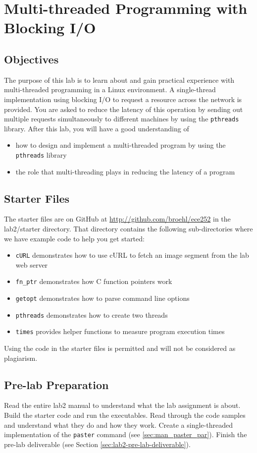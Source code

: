 \chapter{Multi-threaded Programming with Blocking I/O}
\label{ch2_pthreads}

\section{Objectives}
The purpose of this lab is to learn about and gain practical experience with multi-threaded programming in a Linux environment. A single-thread implementation using blocking I/O to request a resource across the network is provided. You are asked to reduce the latency of this operation by sending out multiple requests simultaneously to different machines by using the \verb+pthreads+ library. After this lab, you will have a good understanding of
\begin{itemize}
  \item  how to design and implement a multi-threaded program by using the \verb+pthreads+ library
  \item  the role that multi-threading plays in reducing the latency of a program
\end{itemize}

\section{Starter Files}
The starter files are on GitHub at \url{http://github.com/broehl/ece252} in the lab2/starter directory.
That directory contains the following sub-directories where we have example code to help you get started:
\begin{itemize}
    \item \verb+cURL+ demonstrates how to use cURL to fetch an image segment from the lab web server
    \item \verb+fn_ptr+ demonstrates how C function pointers work
    \item \verb+getopt+ demonstrates how to parse command line options
    \item \verb+pthreads+ demonstrates how to create two threads
    \item \verb+times+ provides helper functions to measure program execution times
\end{itemize}
Using the code in the starter files is permitted and will not be considered as plagiarism.

\section{Pre-lab Preparation}
Read the entire lab2 manual to understand what the lab assignment is about. Build the starter code and run the executables. Read through the code samples and understand what they do and how they work. Create a single-threaded implementation of the \verb+paster+ command (see \ref{sec:man_paster_par}).
Finish the pre-lab deliverable (see Section \ref{sec:lab2-pre-lab-deliverable}).

